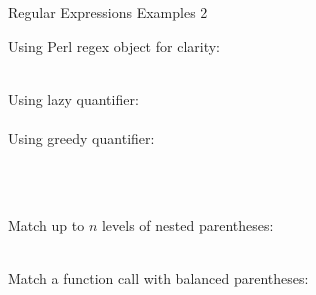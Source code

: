 \documentclass[11pt, a4paper, landscape]{scrartcl}
\newcommand{\regex}[1]{\texttt{#1}}
\begin{document}
\begin{cheatsheet}{Regular Expressions Examples 2}

\begin{col1}


Using Perl regex object for clarity:\\
\regex{}\\


Using lazy quantifier:\\
\regex{}\\

Using greedy quantifier:\\
\regex{}\\

\end{col1}

\begin{col2}


\regex{}\\


\regex{}

\end{col2}

\begin{col3}


Match up to $n$ levels of nested parentheses:\\
\regex{}\\


Match a function call with balanced parentheses:\\
\regex{}\\

\end{col3}

\end{cheatsheet}

\newpage
\end{document}
